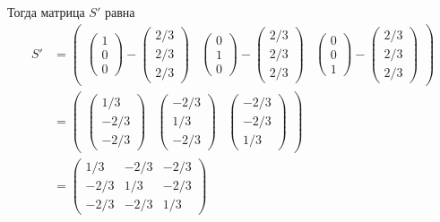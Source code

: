\documentclass[a4paper,12pt]{article}
\begin{document}
\begin{solution}
    Тогда матрица $S'$ равна
    \begin{equation}
    \begin{split}
      S' &= \begin{pmatrix}
        \begin{pmatrix}1\\ 0\\ 0\end{pmatrix} - \begin{pmatrix}2/3\\ 2/3\\ 2/3\end{pmatrix}
        & \begin{pmatrix}0\\ 1\\ 0\end{pmatrix} - \begin{pmatrix}2/3\\ 2/3\\ 2/3\end{pmatrix}
        & \begin{pmatrix}0\\ 0\\ 1\end{pmatrix} - \begin{pmatrix}2/3\\ 2/3\\ 2/3\end{pmatrix}
      \end{pmatrix}\\
      &= \begin{pmatrix}
        \begin{pmatrix}1/3\\ -2/3\\ -2/3\end{pmatrix}
        & \begin{pmatrix}-2/3\\ 1/3\\ -2/3\end{pmatrix}
        & \begin{pmatrix}-2/3\\ -2/3\\ 1/3\end{pmatrix}
      \end{pmatrix}\\
      &= \begin{pmatrix}
        1/3 & -2/3 & -2/3\\
        -2/3 & 1/3 & -2/3\\
        -2/3 & -2/3 & 1/3
      \end{pmatrix}
    \end{split}
    \end{equation}
  \end{solution}
\end{document}
